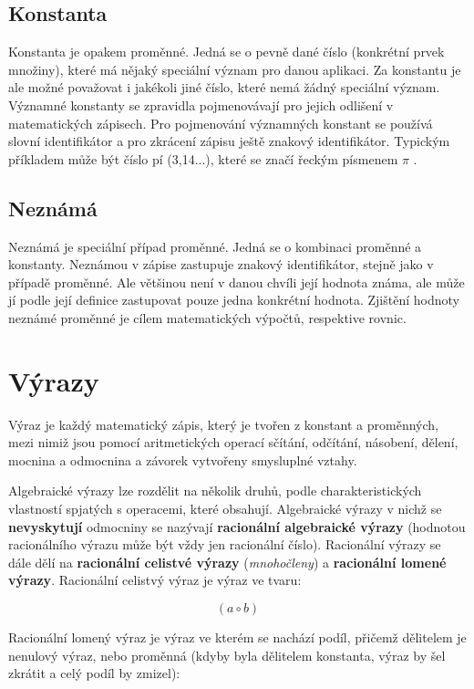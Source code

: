 \documentclass[11pt]{article}
\begin{document}
\subsection{Konstanta}

Konstanta je opakem proměnné. Jedná se o pevně dané číslo (konkrétní prvek množiny), které má nějaký speciální význam pro danou aplikaci. Za konstantu je ale možné považovat i jakékoli jiné číslo, které nemá žádný speciální význam. Významné konstanty se zpravidla pojmenovávají pro jejich odlišení v matematických zápisech. Pro pojmenování významných konstant se používá slovní identifikátor a pro zkrácení zápisu ještě znakový identifikátor. Typickým příkladem může být číslo pí (3,14...), které se značí řeckým písmenem $\pi$ .

\subsection{Neznámá}

Neznámá je speciální případ proměnné. Jedná se o kombinaci proměnné a konstanty. Neznámou v zápise zastupuje znakový identifikátor, stejně jako v případě proměnné. Ale většinou není v danou chvíli její hodnota známa, ale může jí podle její definice zastupovat pouze jedna konkrétní hodnota. Zjištění hodnoty neznámé proměnné je cílem matematických výpočtů, respektive rovnic.

\section{Výrazy}

Výraz je každý matematický zápis, který je tvořen z konstant a proměnných, mezi nimiž jsou pomocí aritmetických operací sčítání, odčítání, násobení, dělení, mocnina a odmocnina a závorek vytvořeny smysluplné vztahy.

Algebraické výrazy lze rozdělit na několik druhů, podle charakteristických vlastností spjatých s operacemi, které obsahují. Algebraické výrazy v nichž se {\bf nevyskytují} odmocniny se nazývají {\bf racionální algebraické výrazy} (hodnotou racionálního výrazu může být vždy jen racionální číslo). Racionální výrazy se dále dělí na {\bf racionální celistvé výrazy} ({\it mnohočleny}) a {\bf racionální lomené výrazy}. Racionální celistvý výraz je výraz ve tvaru:

$$ (a \circ b) $$

Racionální lomený výraz je výraz ve kterém se nachází podíl, přičemž dělitelem je nenulový výraz, nebo proměnná (kdyby byla dělitelem konstanta, výraz by šel zkrátit a celý podíl by zmizel):
\end{document}
